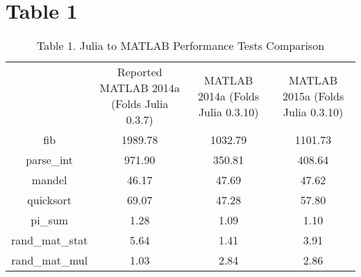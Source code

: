 \section{Table 1}
\label{} 
\begin{table} 
    \begin{tabular}{ c c c c }
         & Reported MATLAB 2014a (Folds Julia 0.3.7) & MATLAB 2014a (Folds Julia 0.3.10) & MATLAB 2015a (Folds Julia 0.3.10) \\ 
        fib & 1989.78 & 1032.79 & 1101.73 \\ 
        parse\_int & 971.90 & 350.81 & 408.64 \\ 
        mandel & 46.17 & 47.69 & 47.62 \\ 
        quicksort & 69.07 & 47.28 & 57.80 \\ 
        pi\_sum & 1.28 & 1.09 & 1.10 \\ 
        rand\_mat\_stat & 5.64 & 1.41 & 3.91 \\ 
        rand\_mat\_mul & 1.03 & 2.84 & 2.86 \\ 
    \end{tabular} 
    \caption{Table 1. Julia to MATLAB Performance Tests Comparison} 
\end{table}

  
  
  
  
  
  
  
  
  
  
  
  
  
  